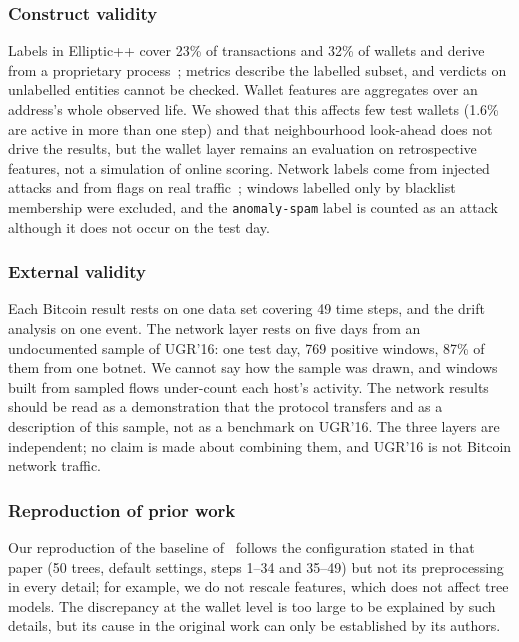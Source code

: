 \subsubsection{Construct validity} Labels in Elliptic++ cover 23\% of transactions and 32\% of wallets and derive from a proprietary process~\cite{weber2019}; metrics describe the labelled subset, and verdicts on unlabelled entities cannot be checked. Wallet features are aggregates over an address's whole observed life. We showed that this affects few test wallets (1.6\% are active in more than one step) and that neighbourhood look-ahead does not drive the results, but the wallet layer remains an evaluation on retrospective features, not a simulation of online scoring. Network labels come from injected attacks and from flags on real traffic~\cite{macia2018}; windows labelled only by blacklist membership were excluded, and the \texttt{anomaly-spam} label is counted as an attack although it does not occur on the test day.

\subsubsection{External validity} Each Bitcoin result rests on one data set covering 49 time steps, and the drift analysis on one event. The network layer rests on five days from an undocumented sample of UGR'16: one test day, 769 positive windows, 87\% of them from one botnet. We cannot say how the sample was drawn, and windows built from sampled flows under-count each host's activity. The network results should be read as a demonstration that the protocol transfers and as a description of this sample, not as a benchmark on UGR'16. The three layers are independent; no claim is made about combining them, and UGR'16 is not Bitcoin network traffic.

\subsubsection{Reproduction of prior work} Our reproduction of the baseline of~\cite{elmougy2023} follows the configuration stated in that paper (50 trees, default settings, steps 1--34 and 35--49) but not its preprocessing in every detail; for example, we do not rescale features, which does not affect tree models. The discrepancy at the wallet level is too large to be explained by such details, but its cause in the original work can only be established by its authors.

